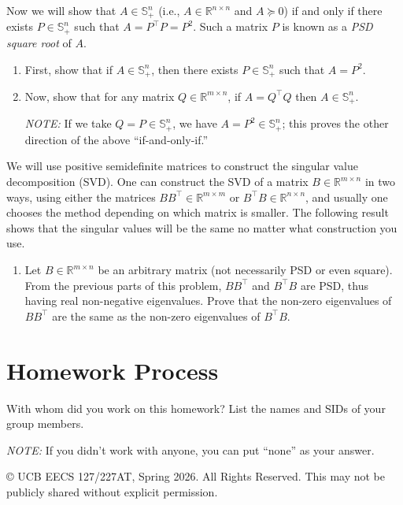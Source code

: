 \documentclass[10pt]{article}
\theoremstyle{definition}
\theoremstyle{plain}
\newcommand{\RR}{\mathbb{R}}
\begin{document}
Now we will show that $A \in \mathbb{S}^n_+$ (i.e., $A \in \RR^{n \times n}$ and $A \succeq 0$) if and only if there exists $P \in \mathbb{S}^n_+$ such that $A = P^\top P = P^2$. Such a matrix $P$ is known as a \emph{PSD square root} of $A$.

\begin{enumerate}[label=(\alph*), resume]
    \item First, show that if $A \in \mathbb{S}^n_+$, then there exists $P \in \mathbb{S}^n_+$ such that $A = P^2$.

    \item Now, show that for any matrix $Q \in \RR^{m \times n}$, if $A = Q^\top Q$ then $A \in \mathbb{S}^n_+$.

    \emph{NOTE:} If we take $Q = P \in \mathbb{S}^n_+$, we have $A = P^2 \in \mathbb{S}^n_+$; this proves the other direction of the above ``if-and-only-if.''
\end{enumerate}

We will use positive semidefinite matrices to construct the singular value decomposition (SVD). One can construct the SVD of a matrix $B \in \RR^{m \times n}$ in two ways, using either the matrices $BB^\top \in \RR^{m \times m}$ or $B^\top B \in \RR^{n \times n}$, and usually one chooses the method depending on which matrix is smaller. The following result shows that the singular values will be the same no matter what construction you use.

\begin{enumerate}[label=(\alph*), resume]
    \item Let $B \in \RR^{m \times n}$ be an arbitrary matrix (not necessarily PSD or even square). From the previous parts of this problem, $BB^\top$ and $B^\top B$ are PSD, thus having real non-negative eigenvalues. Prove that the non-zero eigenvalues of $BB^\top$ are the same as the non-zero eigenvalues of $B^\top B$.
\end{enumerate}

\section{Homework Process}

With whom did you work on this homework? List the names and SIDs of your group members.

\emph{NOTE:} If you didn't work with anyone, you can put ``none'' as your answer.

\vfill
\begin{center}
    \small \copyright{} UCB EECS 127/227AT, Spring 2026. All Rights Reserved. This may not be publicly shared without explicit permission.
\end{center}
\end{document}
